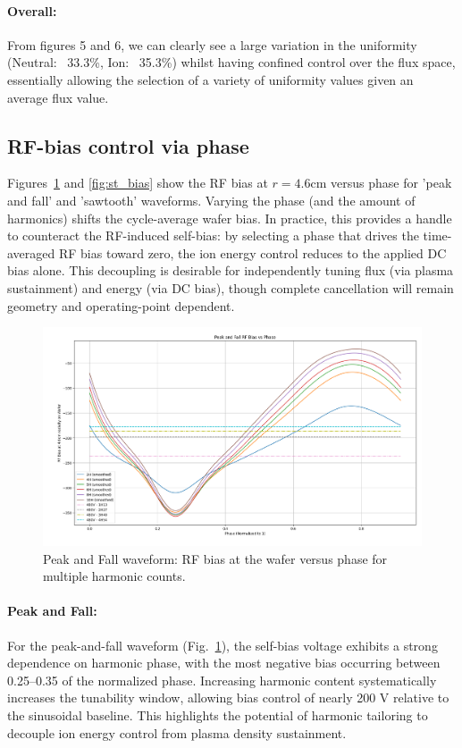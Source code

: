 \documentclass[12pt]{article}
\begin{document}
\paragraph{Overall:}
From figures 5 and 6, we can clearly see a large variation in the uniformity (Neutral: ~33.3\%, Ion: ~35.3\%) whilst having confined control over the flux space, essentially allowing the selection of a variety of uniformity values given an average flux value. 



\subsection{RF-bias control via phase}
Figures~\ref{fig:pf_bias} and \ref{fig:st_bias} show the RF bias at $r=4.6$cm versus phase for 'peak and fall' and 'sawtooth' waveforms. Varying the phase (and the amount of harmonics) shifts the cycle-average wafer bias. In practice, this provides a handle to counteract the RF-induced self-bias: by selecting a phase that drives the time-averaged RF bias toward zero, the ion energy control reduces to the applied DC bias alone. This decoupling is desirable for independently tuning flux (via plasma sustainment) and energy (via DC bias), though complete cancellation will remain geometry and operating-point dependent.

\begin{figure}[H]
  \centering
  \includegraphics[width=\linewidth]{Figures/Peak and Fall - Harmonics Potential vs Phase.png}
  \caption{Peak and Fall waveform: RF bias at the wafer versus phase for multiple harmonic counts.}
  \label{fig:pf_bias}
\end{figure}

\paragraph{Peak and Fall:}
For the peak-and-fall waveform (Fig.~\ref{fig:pf_bias}), the self-bias voltage exhibits a strong dependence on harmonic phase, with the most negative bias occurring between 0.25–0.35 of the normalized phase. Increasing harmonic content systematically increases the tunability window, allowing bias control of nearly 200 V relative to the sinusoidal baseline. This highlights the potential of harmonic tailoring to decouple ion energy control from plasma density sustainment.
\end{document}
